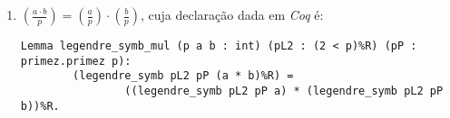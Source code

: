 \begin{enumerate}

        
        \item $\left(\frac{a \cdot b}{p}\right) = \left(\frac{a}{p}\right) \cdot \left(\frac{b}{p}\right)$, cuja declaração dada em \textit{Coq} é:
        \newline
                \begin{lstlisting}[language=coq,frame=single,tabsize=1]
Lemma legendre_symb_mul (p a b : int) (pL2 : (2 < p)%R) (pP : primez.primez p):
        (legendre_symb pL2 pP (a * b)%R) = 
                ((legendre_symb pL2 pP a) * (legendre_symb pL2 pP b))%R.
                \end{lstlisting}
        \end{enumerate}


